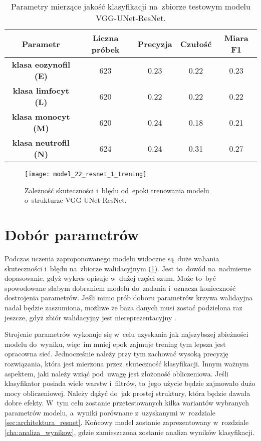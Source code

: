 {\begin{table}[h!]
\centering
\caption[Short Heading]{Parametry mierzące jakość klasyfikacji na~zbiorze testowym modelu VGG-UNet-ResNet.}
\label{tab:ResNet_1_params_val}
\begin{tabular}{|c|c|c|c|c|}
\hline
\textbf{Parametr}                               & \textbf{Liczna próbek} & \textbf{Precyzja} & \textbf{Czułość} & \textbf{Miara F1} \\ \hline
\textbf{klasa eozynofil (E)}  & 623 & 0.23   & 0.22   & 0.23 \\ \hline
\textbf{klasa limfocyt (L)} & 620 & 0.22  & 0.22 & 0.22  \\ \hline
\textbf{klasa monocyt (M)} & 620  & 0.24   & 0.18    & 0.21  \\ \hline
\textbf{klasa neutrofil (N)} & 624 & 0.24   & 0.31    & 0.27   \\ \hline
\end{tabular}
\end{table}

\begin{figure}[h!]
	\centering
	\centering
		\texttt{[image: model\_22\_resnet\_1\_trening]}	
	\caption{Zależność skuteczności i~błędu od~epoki trenowania modelu o~strukturze VGG-UNet-ResNet.}	\label{fig:model_22_resnet_1_trening}
\end{figure}

}
\section{Dobór parametrów}
\label{dobor_parametrow}

Podczas uczenia zaproponowanego modelu widoczne są~duże wahania skuteczności i~błędu na~zbiorze walidacyjnym (\ref{fig:model_22_resnet_1_trening}). Jest to~dowód na~nadmierne dopasowanie, gdyż wykres opisuje w~dużej części szum. Może to~być spowodowane słabym dobraniem modelu do~zadania i~oznacza konieczność dostrojenia parametrów. Jeśli mimo prób doboru parametrów krzywa walidayjna nadal będzie zaszumiona, możliwe że baza danych musi zostać podzielona raz jeszcze, gdyż zbiór walidacyjny jest niereprezentacyjny \cite{learning_curve_diagnostics}.

{\parindent0pt
Strojenie parametrów wykonuje się w~celu uzyskania jak najszybszej zbieżności modelu do~wyniku, więc~im mniej epok zajmuje trening tym lepsza jest opracowna sieć. Jednocześnie należy przy tym zachować wysoką precyzję rozwiązania, która jest mierzona przez~skuteczność klasyfikacji. Innym ważnym aspektem, jaki należy wziąć pod~uwagę jest złożoność obliczeniowa. Jeśli klasyfikator posiada wiele warstw i~filtrów, to~jego użycie będzie zajmowało dużo mocy obliczeniowej. Należy dążyć do~jak prostej struktury, która będzie dawała dobre efekty. W~tym celu zostanie przetestowanych kilka wariantów wybranych parametrów modelu, a~wyniki porównane z~uzyskanymi w~rozdziale \ref{sec:architektura_resnet}. Końcowy model zostanie zaprezentowany w~rozdziale \ref{cha:analiza_wynikow}, gdzie zamieszczona zostanie analiza wyników klasyfikacji.
}
